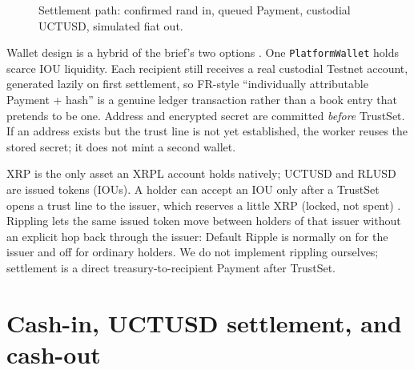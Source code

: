 \documentclass[11pt]{article}
\begin{document}
\begin{figure}[ht]
\centering
{}
\caption{Settlement path: confirmed rand in, queued Payment, custodial UCTUSD, simulated fiat out.}
\label{fig:flow}
\end{figure}

Wallet design is a hybrid of the brief's two options \citep{UCTBrief2026,UCTResources2026}. One \texttt{PlatformWallet} holds scarce IOU liquidity. Each recipient still receives a real custodial Testnet account, generated lazily on first settlement, so FR-style ``individually attributable Payment + hash'' is a genuine ledger transaction rather than a book entry that pretends to be one. Address and encrypted secret are committed \emph{before} TrustSet. If an address exists but the trust line is not yet established, the worker reuses the stored secret; it does not mint a second wallet.

XRP is the only asset an XRPL account holds natively; UCTUSD and RLUSD are issued tokens (IOUs). A holder can accept an IOU only after a TrustSet opens a trust line to the issuer, which reserves a little XRP (locked, not spent) \citep{UCTResources2026}. Rippling lets the same issued token move between holders of that issuer without an explicit hop back through the issuer: Default Ripple is normally on for the issuer and off for ordinary holders. We do not implement rippling ourselves; settlement is a direct treasury-to-recipient Payment after TrustSet.

\section{Cash-in, UCTUSD settlement, and cash-out}
\end{document}
